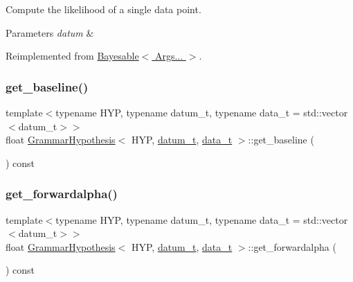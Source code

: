 Compute the likelihood of a single data point. 


\begin{DoxyParams}{Parameters}
{\em datum} & \\
\hline
\end{DoxyParams}


Reimplemented from \hyperlink{class_bayesable_a87d195bfe5cdf6d293dae5fc01ae2e6c}{Bayesable$<$ Args... $>$}.

\mbox{\label{class_grammar_hypothesis_a3f86d5e2ab9a801e5cce7a0ada8cfc1d}} 
\subsubsection{\texorpdfstring{get\+\_\+baseline()}{get\_baseline()}}
{\footnotesize\ttfamily template$<$typename H\+YP, typename datum\+\_\+t, typename data\+\_\+t = std\+::vector$<$datum\+\_\+t$>$$>$ \\
float \hyperlink{class_grammar_hypothesis}{Grammar\+Hypothesis}$<$ H\+YP, \hyperlink{class_bayesable_a9f1a6c0cd7855550fa10b1a8f13a5867}{datum\+\_\+t}, \hyperlink{class_bayesable_aa2788c4d7718c0a824e1d28c4c98f921}{data\+\_\+t} $>$\+::get\+\_\+baseline (\begin{DoxyParamCaption}{ }\end{DoxyParamCaption}) const\hspace{0.3cm}{\ttfamily [inline]}}

\mbox{\label{class_grammar_hypothesis_aaad31cff6237040d890bb4f6bf1b0bb6}} 
\subsubsection{\texorpdfstring{get\+\_\+forwardalpha()}{get\_forwardalpha()}}
{\footnotesize\ttfamily template$<$typename H\+YP, typename datum\+\_\+t, typename data\+\_\+t = std\+::vector$<$datum\+\_\+t$>$$>$ \\
float \hyperlink{class_grammar_hypothesis}{Grammar\+Hypothesis}$<$ H\+YP, \hyperlink{class_bayesable_a9f1a6c0cd7855550fa10b1a8f13a5867}{datum\+\_\+t}, \hyperlink{class_bayesable_aa2788c4d7718c0a824e1d28c4c98f921}{data\+\_\+t} $>$\+::get\+\_\+forwardalpha (\begin{DoxyParamCaption}{ }\end{DoxyParamCaption}) const\hspace{0.3cm}{\ttfamily [inline]}}

